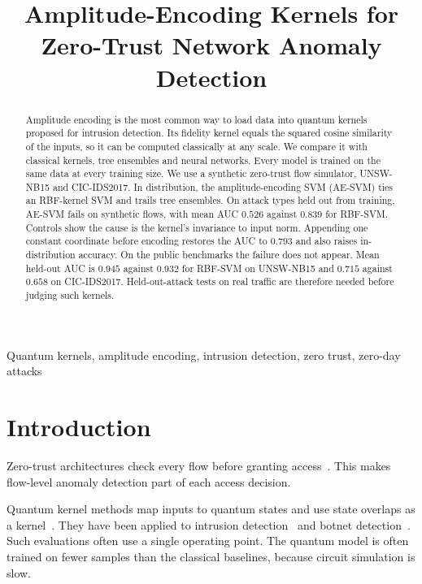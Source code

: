 \documentclass[conference,10pt]{IEEEtran}
\title{Amplitude-Encoding Kernels for Zero-Trust Network Anomaly Detection}
\author{
  \IEEEauthorblockN{Arnav Kapoor}
  \IEEEauthorblockA{Department of Computer Science and Engineering\\
  \textit{Indian Institute of Science Education and Research Bhopal}\\
  Bhopal, India\\
  arnavkapoor23@iiserb.ac.in}
}
\begin{document}
\maketitle

\begin{abstract}
Amplitude encoding is the most common way to load data into quantum kernels
proposed for intrusion detection. Its fidelity kernel equals the squared cosine
similarity of the inputs, so it can be computed classically at any scale. We
compare it with classical kernels, tree ensembles and neural networks. Every
model is trained on the same data at every training size. We use a synthetic
zero-trust flow simulator, UNSW-NB15 and CIC-IDS2017. In distribution, the
amplitude-encoding SVM (AE-SVM) ties an RBF-kernel SVM and trails tree
ensembles. On attack types held out from training, AE-SVM fails on synthetic
flows, with mean AUC $0.526$ against $0.839$ for RBF-SVM. Controls show the cause
is the kernel's invariance to input norm. Appending one constant coordinate
before encoding restores the AUC to $0.793$ and also raises in-distribution
accuracy. On the public benchmarks the failure does not appear. Mean held-out AUC
is $0.945$ against $0.932$ for RBF-SVM on UNSW-NB15 and $0.715$ against $0.658$ on CIC-IDS2017. Held-out-attack tests on real traffic are therefore needed
before judging such kernels.
\end{abstract}

\begin{IEEEkeywords}
Quantum kernels, amplitude encoding, intrusion detection, zero trust, zero-day attacks
\end{IEEEkeywords}

\section{Introduction}

Zero-trust architectures check every flow before granting access~\cite{rose2020zero,syed2022zero}.
This makes flow-level anomaly detection part of each access decision.

Quantum kernel methods map inputs to quantum states and use state overlaps as a
kernel~\cite{havlicek2019supervised,schuld2021machine}. They have been applied to
intrusion detection~\cite{kalinin2023security} and botnet
detection~\cite{suryotrisongko2022evaluating}. Such evaluations often use a single
operating point. The quantum model is often trained on fewer samples than the
classical baselines, because circuit simulation is slow.
\end{document}
